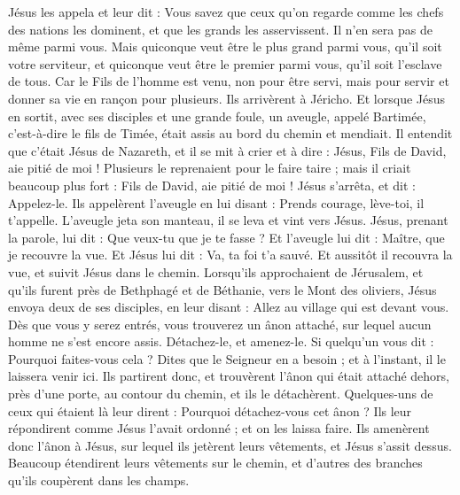 \begin{multicols}{2}
Jésus les appela et leur dit : Vous savez que ceux qu’on regarde comme les chefs des nations les dominent, et que les grands les asservissent.
Il n'en sera pas de même parmi vous. Mais quiconque veut être le plus grand parmi vous, qu’il soit votre serviteur,
et quiconque veut être le premier parmi vous, qu’il soit l’esclave de tous.
Car le Fils de l'homme est venu, non pour être servi, mais pour servir et donner sa vie en rançon pour plusieurs.
Ils arrivèrent à Jéricho. Et lorsque Jésus en sortit, avec ses disciples et une grande foule, un aveugle, appelé Bartimée, c'est-à-dire le fils de Timée, était assis au bord du chemin et mendiait.
Il entendit que c'était Jésus de Nazareth, et il se mit à crier et à dire : Jésus, Fils de David, aie pitié de moi !
Plusieurs le reprenaient pour le faire taire ; mais il criait beaucoup plus fort : Fils de David, aie pitié de moi !
Jésus s’arrêta, et dit : Appelez-le. Ils appelèrent l’aveugle en lui disant : Prends courage, lève-toi, il t'appelle.
L’aveugle jeta son manteau, il se leva et vint vers Jésus.
Jésus, prenant la parole, lui dit : Que veux-tu que je te fasse ? Et l'aveugle lui dit : Maître, que je recouvre la vue.
Et Jésus lui dit : Va, ta foi t'a sauvé.
Et aussitôt il recouvra la vue, et suivit Jésus dans le chemin.
\VerseOne{}Lorsqu’ils approchaient de Jérusalem, et qu’ils furent près de Bethphagé et de Béthanie, vers le Mont des oliviers, Jésus envoya deux de ses disciples,
en leur disant : Allez au village qui est devant vous. Dès que vous y serez entrés, vous trouverez un ânon attaché, sur lequel aucun homme ne s’est encore assis. Détachez-le, et amenez-le.
Si quelqu'un vous dit : Pourquoi faites-vous cela ? Dites que le Seigneur en a besoin ; et à l’instant, il le laissera venir ici.
Ils partirent donc, et trouvèrent l'ânon qui était attaché dehors, près d’une porte, au contour du chemin, et ils le détachèrent.
Quelques-uns de ceux qui étaient là leur dirent : Pourquoi détachez-vous cet ânon ?
Ils leur répondirent comme Jésus l’avait ordonné ; et on les laissa faire.
Ils amenèrent donc l'ânon à Jésus, sur lequel ils jetèrent leurs vêtements, et Jésus s’assit dessus.
Beaucoup étendirent leurs vêtements sur le chemin, et d'autres des branches qu’ils coupèrent dans les champs.

\end{multicols}

